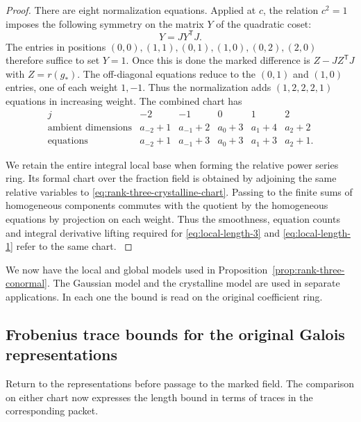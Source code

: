 \begin{proof}
There are eight normalization equations.
Applied at \(c\), the relation \(c^2=1\) imposes the following symmetry on the matrix \(Y\) of the quadratic coset:
\[
 Y=JY^{\mathsf T}J .
\] The entries in positions
\((0,0),(1,1),(0,1),(1,0),(0,2),(2,0)\)
therefore suffice to set \(Y=1\).
Once this is done the marked difference is
\(Z-JZ^{\mathsf T}J\) with \(Z=r(g_*)\).
The off-diagonal equations reduce to the
\((0,1)\) and \((1,0)\) entries, one of
each weight \(1,-1\). Thus the normalization
adds \((1,2,2,2,1)\) equations in
increasing weight. The combined chart has
\[
\begin{array}{c|ccccc}
j&-2&-1&0&1&2\\ \hline
\text{ambient dimensions}&
a_{-2}+1&a_{-1}+2&a_0+3&a_1+4&a_2+2\\
\text{equations}&
a_{-2}+1&a_{-1}+3&a_0+3&a_1+3&a_2+1 .
\end{array}
\tag{10}\label{eq:local-length-10}
\]

We retain the entire integral local base
when forming the relative power series
ring. Its formal chart over the fraction
field is obtained by adjoining the same
relative variables to \eqref{eq:rank-three-crystalline-chart}. Passing to the
finite sums of homogeneous components
commutes with the quotient by the
homogeneous equations by projection on
each weight. Thus the smoothness,
equation counts and integral derivative
lifting required for \eqref{eq:local-length-3} and \eqref{eq:local-length-1} refer
to the same chart.
\hfill\mbox{\cite{milne-duality}}\label{cor:ordinary-rank-three-length-7}

\end{proof}

We now have the local and global models used in
Proposition~\ref{prop:rank-three-conormal}. The Gaussian
model and the crystalline model are used in separate
applications. In each one the bound is read on the original
coefficient ring.

\subsection{Frobenius trace bounds for the original Galois representations}

Return to the representations before passage to the marked field. The comparison on
either chart now expresses the length bound in terms of traces in the corresponding
packet.

